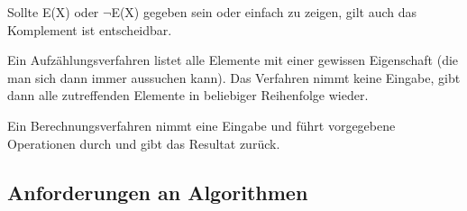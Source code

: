 \documentclass[12pt,a4paper]{article} %
\begin{document}
	Sollte E(X) oder $\neg$E(X) gegeben sein oder einfach zu zeigen, gilt auch das Komplement ist entscheidbar.
	
	Ein Aufzählungsverfahren listet alle Elemente mit einer gewissen Eigenschaft (die man sich dann immer aussuchen kann). Das Verfahren nimmt keine Eingabe, gibt dann alle zutreffenden Elemente in beliebiger Reihenfolge wieder.
	
	Ein Berechnungsverfahren nimmt eine Eingabe und führt vorgegebene Operationen durch und gibt das Resultat zurück.
	
	\subsection{Anforderungen an Algorithmen}
	
	
\end{document}
